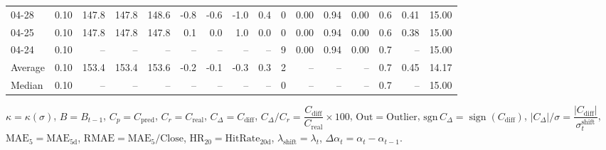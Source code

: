 \begin{threeparttable}
{\begin{tabular}{lrrrrrrrrrrrrrrr}
  04-28 &     0.10 & 147.8 & 147.8 & 148.6 &       -0.8 &           -0.6 &                     -1.0 &                 0.4 &              0 &       0.00 &      0.94 &           0.00 &              0.6 &            0.41 &                  15.00 \\
  04-25 &     0.10 & 147.8 & 147.8 & 147.8 &        0.1 &            0.0 &                      1.0 &                 0.0 &              0 &       0.00 &      0.94 &           0.00 &              0.6 &            0.38 &                  15.00 \\
  04-24 &     0.10 &    -- &    -- &    -- &         -- &             -- &                       -- &                  -- &              9 &       0.00 &      0.94 &           0.00 &              0.7 &              -- &                  15.00 \\
Average &     0.10 & 153.4 & 153.4 & 153.6 &       -0.2 &           -0.1 &                     -0.3 &                 0.3 &              2 &         -- &        -- &             -- &              0.7 &            0.45 &                  14.17 \\
 Median &     0.10 &    -- &    -- &    -- &         -- &             -- &                       -- &                  -- &              0 &         -- &        -- &             -- &              0.7 &              -- &                  15.00 \\
\bottomrule
\end{tabular}
}
\begin{tablenotes}\footnotesize
\item $\kappa=\kappa(\sigma)$, $B=B_{t-1}$, $C_p=C_{\text{pred}}$, $C_r=C_{\text{real}}$, $C_\Delta=C_{\text{diff}}$, $C_\Delta/C_r=\dfrac{C_{\text{diff}}}{C_{\text{real}}}\times100$, $\mathrm{Out}=\text{Outlier}$, $\mathrm{sgn}\,C_\Delta=\operatorname{sign}(C_{\text{diff}})$, $|C_\Delta|/\sigma=\dfrac{|C_{\text{diff}}|}{\sigma_t^{\text{shift}}}$, $\mathrm{MAE}_5=\mathrm{MAE}_{5\text{d}}$, $\mathrm{RMAE}= \mathrm{MAE}_5 / \text{Close}$, $\mathrm{HR}_{20}=\mathrm{HitRate}_{20\text{d}}$, 
$\lambda_{\text{shift}}=\lambda_t$, 
$\Delta\alpha_t=\alpha_t-\alpha_{t-1}$.
\end{tablenotes}
\end{threeparttable}
\endgroup

